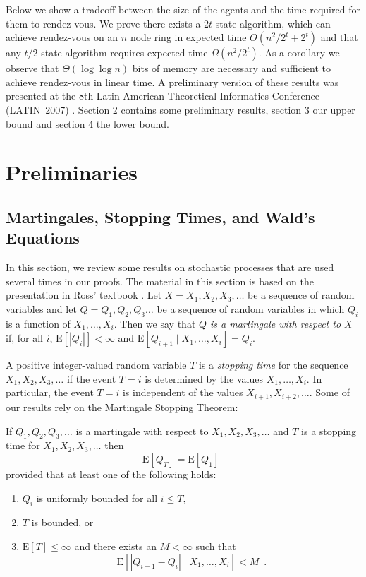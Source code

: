 \documentclass[lotsofwhite]{patmorin}
\newcommand{\E}{\mathrm{E}}
\begin{document}
Below we show a tradeoff between the size of the agents and the time
required for them to rendez-vous. We prove there exists a $2t$ state
algorithm,   which can achieve rendez-vous on an $n$ node ring in
expected time $O(n^2/2^{t} + 2^{t} )$ and that any $t/2$ state
algorithm requires expected time $\Omega( n^2/2^t )$.  As a corollary
we observe that $\Theta(\log \log n)$ bits of memory are necessary and
sufficient to achieve rendez-vous in linear time.  A preliminary
version of these results was presented at the 8th Latin American
Theoretical Informatics Conference (LATIN~2007) \cite{latin}. Section
2 contains some preliminary results, section 3 our upper bound and
section 4 the lower bound.   


\section{Preliminaries}

\subsection{Martingales, Stopping Times, and Wald's Equations}

In this section, we review some results on stochastic processes that
are used several times in our proofs.  The material in this section is
based on the presentation in Ross' textbook \cite[Chapter 6]{ross}.
Let $X=X_1,X_2,X_3,\ldots$ be a sequence of random variables and let
$Q=Q_1,Q_2,Q_3\ldots$ be a sequence of random variables in which $Q_i$
is a function of $X_1,\ldots,X_i$.  Then we say that \emph{$Q$ is a
martingale with respect to $X$} if, for all $i$, $\E[|Q_i|] < \infty$
and $\E[Q_{i+1}\mid X_1,\ldots,X_i] = Q_i$.

A positive integer-valued random variable $T$ is a \emph{stopping
time} for the sequence $X_1,X_2,X_3,\ldots$ if the event $T=i$ is
determined by the values $X_1,\ldots,X_i$.  In particular, the event
$T=i$ is independent of the values $X_{i+1},X_{i+2},\ldots$.  Some of
our results rely on the Martingale Stopping Theorem:

\begin{thm}
If $Q_1,Q_2,Q_3,\ldots$ is a martingale with respect to
$X_1,X_2,X_3,\ldots$ and $T$ is a stopping time for
$X_1,X_2,X_3,\ldots$ then
\[
   \E[Q_T] = \E[Q_1] \enspace 
\]
provided that at least one of the following holds:
\begin{enumerate}
\item $Q_i$ is uniformly bounded for all $i\le T$,
\item $T$ is bounded, or
\item $\E[T]\le \infty$ and there exists an $M<\infty$ such that
\[ \E\left[|Q_{i+1}-Q_i| \mid X_1,\ldots,X_i \right] < M  \enspace . \]
\end{enumerate}
\end{thm}
\end{document}
